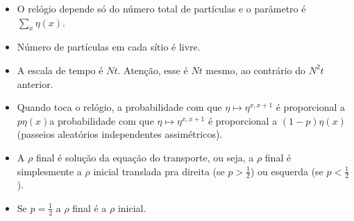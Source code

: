 \documentclass[letterpaper,12pt]{article}
\def\dd{\displaystyle}
\begin{document}
\begin{itemize}
 \item O rel\'ogio depende s\'o do n\'umero total de part\'iculas e o par\^ametro \'e
$\dd\sum_x \eta(x)$. 
\item N\'umero de part\'iculas em cada s\'itio \'e livre.
\item A escala de tempo \'e $Nt$. Aten\c c\~ao, esse \'e $Nt$ mesmo, ao contr\'ario do $N^2t$ anterior.
\item Quando toca o rel\'ogio, a probabilidade com que $\eta\mapsto\eta^{x,x+1}$ \'e proporcional a $p\eta(x)$a probabilidade com que $\eta\mapsto\eta^{x,x+1}$ \'e proporcional a $(1-p)\eta(x)$ (passeios aleat\'orios independentes
assim\'etricos). 
\item A $\rho$ final \'e solu\c c\~ao da equa\c c\~ao do transporte, ou seja, a $\rho$ final \'e
simplesmente a $\rho$ inicial translada pra direita (se $p>\frac{1}{2}$) ou esquerda (se $p<\frac{1}{2}$).
\item Se $p=\frac{1}{2}$ a $\rho$ final \'e a $\rho$ inicial.
\end{itemize}
\end{document}
